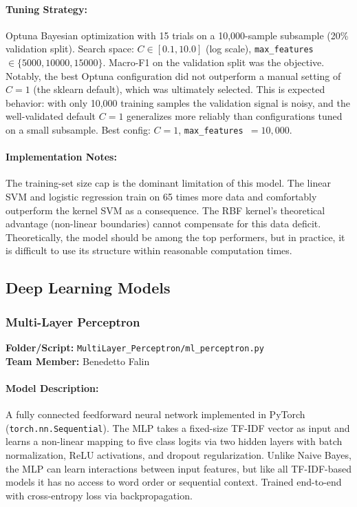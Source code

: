 \documentclass[12pt]{article}
\begin{document}
\paragraph{Tuning Strategy:}
Optuna Bayesian optimization with 15 trials on a 10,000-sample subsample (20\% validation split). Search space: $C \in [0.1, 10.0]$ (log scale), \texttt{max\_features} $\in \{5000, 10000, 15000\}$. Macro-F1 on the validation split was the objective. Notably, the best Optuna configuration did not outperform a manual setting of $C=1$ (the sklearn default), which was ultimately selected. This is expected behavior: with only 10,000 training samples the validation signal is noisy, and the well-validated default $C=1$ generalizes more reliably than configurations tuned on a small subsample. Best config: $C=1$, \texttt{max\_features }$=10{,}000$.
 
\paragraph{Implementation Notes:}
The training-set size cap is the dominant limitation of this model. The linear SVM and logistic regression train on 65 times more data and comfortably outperform the kernel SVM as a consequence. The RBF kernel's theoretical advantage (non-linear boundaries) cannot compensate for this data deficit. Theoretically, the model should be among the top performers, but in practice, it is difficult to use its structure within reasonable computation times.


\subsection{Deep Learning Models}

\subsubsection{Multi-Layer Perceptron}
\textbf{Folder/Script:} \texttt{MultiLayer\_Perceptron/ml\_perceptron.py}\\
\textbf{Team Member:} Benedetto Falin

\paragraph{Model Description:}
A fully connected feedforward neural network implemented in PyTorch (\texttt{torch.nn.Sequential}). The MLP takes a fixed-size TF-IDF vector as input and learns a non-linear mapping to five class logits via two hidden layers with batch normalization, ReLU activations, and dropout regularization. Unlike Naive Bayes, the MLP can learn interactions between input features, but like all TF-IDF-based models it has no access to word order or sequential context. Trained end-to-end with cross-entropy loss via backpropagation.
\end{document}
